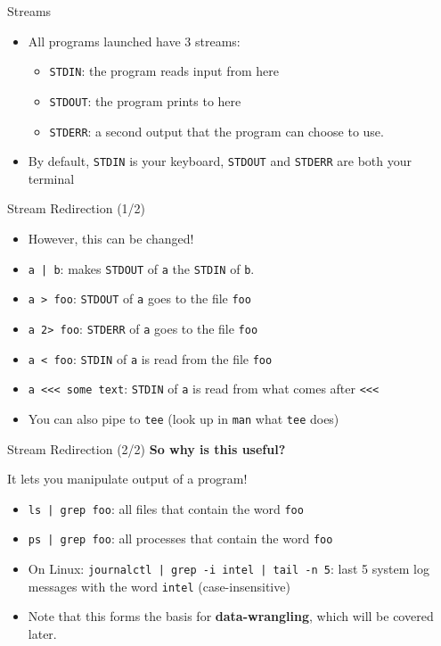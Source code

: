 \documentclass[12pt]{beamer}
\begin{document}
\begin{frame}[fragile]{Streams}
  \begin{itemize}
    \item All programs launched have 3 streams:
          \begin{itemize}
            \item \texttt{STDIN}: the program reads input from here
            \item \texttt{STDOUT}: the program prints to here
            \item \texttt{STDERR}: a second output that the program can choose to use.
          \end{itemize}
    \item By default, \texttt{STDIN} is your keyboard, \texttt{STDOUT} and \texttt{STDERR} are both your terminal
  \end{itemize}
\end{frame}

\begin{frame}[fragile]{Stream Redirection (1/2)}
  \begin{itemize}
    \item However, this can be changed!
    \item \texttt{a | b}: makes \texttt{STDOUT} of \texttt{a} the \texttt{STDIN} of \texttt{b}.
    \item \texttt{a > foo}: \texttt{STDOUT} of \texttt{a} goes to the file \texttt{foo}
    \item \texttt{a 2> foo}: \texttt{STDERR} of \texttt{a} goes to the file \texttt{foo}
    \item \texttt{a < foo}: \texttt{STDIN} of \texttt{a} is read from the file \texttt{foo}
    \item \texttt{a <<< some text}: \texttt{STDIN} of \texttt{a} is read from what comes after \texttt{<<<}
    \item You can also pipe to \texttt{tee} (look up in \texttt{man} what \texttt{tee} does)
  \end{itemize}
\end{frame}

\begin{frame}[fragile]{Stream Redirection (2/2)}
  \textbf{So why is this useful?} \pause

  It lets you manipulate output of a program!
  \pause
  \begin{itemize}
    \item \texttt{ls | grep foo}: all files that contain the word \texttt{foo}
    \item \texttt{ps | grep foo}: all processes that contain the word \texttt{foo}
    \item On Linux: \texttt{journalctl | grep -i intel | tail -n 5}: last 5 system log messages with the word \texttt{intel} (case-insensitive)
    \item Note that this forms the basis for \textbf{data-wrangling}, which will be covered later.
  \end{itemize}
\end{frame}
\end{document}
